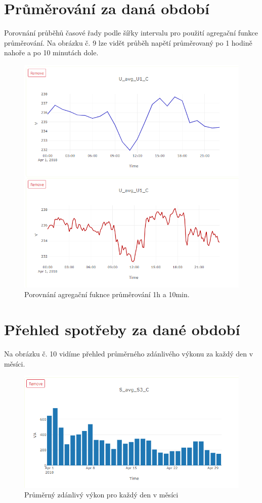 \documentclass[FM,BP]{tulthesis}
\begin{document}
    \section{Průměrování za daná období}
        Porovnání průběhů časové řady podle šířky intervalu pro použití agregační funkce průměrování. 
        Na obrázku č. 9 lze vidět průběh napětí průměrovaný po 1 hodině nahoře a po 10 minutách dole.
        \begin{figure}[h]
            \centering
            \includegraphics[scale=0.7]{pic/prumetovani.PNG}
            \caption{Porovnání agregační fuknce průměrování 1h a 10min.} \label{Obrázek č. 8}
        \end{figure}
    \section{Přehled spotřeby za dané období}
        Na obrázku č. 10 vidíme přehled průměrného zdánlivého výkonu za každý den v měsíci.
        \begin{figure}[h]
            \centering
            \includegraphics[scale=0.7]{pic/sko.PNG}
            \caption{Průměrný zdánlivý výkon pro každý den v měsíci} \label{Obrázek č. 8}
        \end{figure}
\end{document}
